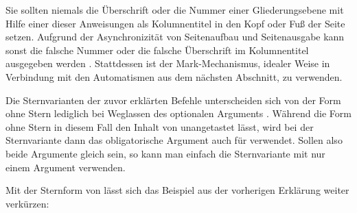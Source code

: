 %
Sie sollten niemals die Überschrift oder die Nummer einer Gliederungsebene mit
Hilfe einer dieser Anweisungen als Kolumnentitel in den Kopf oder Fuß der
Seite setzen. Aufgrund der Asynchronizität von Seitenaufbau und Seitenausgabe
kann %
\iffalse%
es sonst leicht geschehen, dass die falsche Nummer oder die falsche
Überschrift im Kolumnentitel ausgegeben wird%
\else%
sonst die falsche Nummer oder die falsche Überschrift im Kolumnentitel
ausgegeben werden%
\fi%
. Stattdessen ist der Mark-Mechanismus, idealer Weise in Verbindung mit den
Automatismen aus dem nächsten Abschnitt, zu verwenden.%
\EndIndexGroup


\begin{Declaration}
\end{Declaration}
Die Sternvarianten der zuvor
erklärten Befehle unterscheiden sich von der Form ohne Stern lediglich bei
Weglassen des optionalen Arguments . Während die Form ohne Stern in diesem Fall den Inhalt
von  unangetastet lässt, wird
bei der Sternvariante dann das obligatorische Argument  auch für 
verwendet. Sollen also beide Argumente gleich sein, so kann man einfach die
Sternvariante mit nur einem Argument verwenden.%
%
\begin{Example}
  Mit der Sternform von  lässt sich das
  Beispiel aus der vorherigen Erklärung weiter verkürzen:
%
\end{Example}%
\EndIndexGroup


